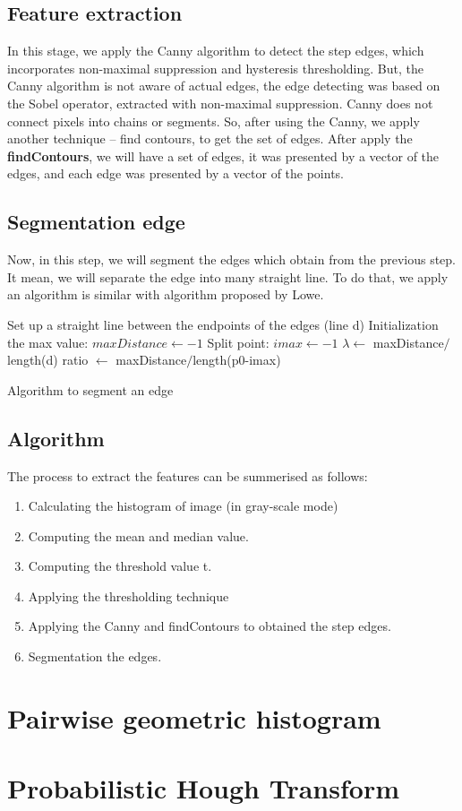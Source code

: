 \subsection{Feature extraction}
In this stage, we apply the Canny algorithm to detect the step edges, which incorporates non-maximal suppression and hysteresis thresholding. But, the Canny algorithm is not aware of actual edges, the edge detecting was based on the Sobel operator, extracted with non-maximal suppression. Canny does not connect pixels into chains or segments. So, after using the Canny, we apply another technique – find contours,  to get the set of edges. After apply the \textbf{findContours}, we will have a set of edges, it was presented by a vector of the edges, and each edge was presented by a vector of the points.
\subsection{Segmentation edge}
Now, in this step, we will segment the edges which obtain from the previous step. It mean, we will separate the edge into many straight line. To do that, we apply an algorithm is similar with algorithm proposed by Lowe.\\
\IncMargin{1em}
\begin{algorithm}[H]
\Indm 
{}
\Indp
Set up a straight line between the endpoints of the edges (line d)\;
Initialization the max value: $maxDistance  \leftarrow -1 $\;
Split point: $imax \leftarrow -1$ \; 
$\lambda \leftarrow $ maxDistance$/$length(d)\;
ratio $ \leftarrow $ maxDistance$/$length(p0-imax)\;
\caption{Algorithm to segment an edge}
\end{algorithm}\DecMargin{1em}
\subsection{Algorithm}
The process to extract the features can be summerised as follows:
\begin{enumerate}
\item Calculating the histogram of image (in gray-scale mode)
\item Computing the mean and median value.
\item Computing the threshold value t.
\item Applying the thresholding technique
\item Applying the Canny and findContours to obtained the step edges.
\item Segmentation the edges.
\end{enumerate}
\section{Pairwise geometric histogram}
\section{Probabilistic Hough Transform}